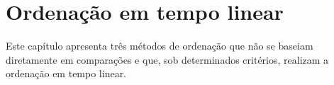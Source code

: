 \chapter{Ordenação em tempo linear}\label{cap:lineares}
Este capítulo apresenta três métodos de ordenação que não se baseiam diretamente em comparações e que, sob determinados critérios, realizam a ordenação em tempo linear.



